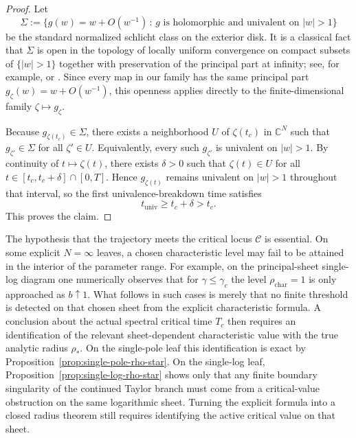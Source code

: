 \documentclass[11pt]{amsart}
\numberwithin{equation}{section}
\theoremstyle{plain}
\theoremstyle{definition}
\theoremstyle{remark}
\newcommand{\CC}{\mathbb{C}}
\newcommand{\univ}{\mathrm{univ}}
\begin{document}
\begin{proof}
	Let
	\[
		\Sigma:=\bigl\{g(w)=w+O(w^{-1})\, :\, g \text{ is holomorphic and univalent on } |w|>1\bigr\}
	\]
	be the standard normalized schlicht class on the exterior disk. It is a classical fact that $\Sigma$ is open in the topology
	of locally uniform convergence on compact subsets of $\{|w|>1\}$ together with preservation of the principal part at infinity;
	see, for example, \cite[Ch.~I]{Pommerenke1992} or \cite[Ch.~2]{Duren1983}. Since every map in our family has the same principal part
	$g_\zeta(w)=w+O(w^{-1})$, this openness applies directly to the finite-dimensional family
	$\zeta\mapsto g_\zeta$.

	Because $g_{\zeta(t_c)}\in\Sigma$, there exists a neighborhood $U$ of $\zeta(t_c)$ in $\CC^N$ such that
	$g_{\zeta'}\in\Sigma$ for all $\zeta'\in U$. Equivalently, every such $g_{\zeta'}$ is univalent on $|w|>1$.
	By continuity of $t\mapsto \zeta(t)$, there exists $\delta>0$ such that
	$\zeta(t)\in U$ for all $t\in[t_c,t_c+\delta]\cap[0,T]$. Hence $g_{\zeta(t)}$ remains univalent on $|w|>1$
	throughout that interval, so the first univalence-breakdown time satisfies
	\[
		t_{\univ}\ge t_c+\delta>t_c.
	\]
	This proves the claim.
\end{proof}

	The hypothesis that the trajectory meets the critical locus \(\mathcal C\) is essential.
	On some explicit \(N=\infty\) leaves, a chosen characteristic level may fail to be
	attained in the interior of the parameter range. For example, on the
	principal-sheet single-log diagram one numerically observes that for
	\(\gamma\le\gamma_c\) the level \(\rho_{\mathrm{char}}=1\) is only approached as
	\(b\uparrow1\). What follows in such cases is merely that no finite threshold is
	detected on that chosen sheet from the explicit characteristic formula.
	A conclusion about the actual spectral critical time \(T_c\) then requires an
	identification of the relevant sheet-dependent characteristic value with the true
	analytic radius \(\rho_*\). On the single-pole leaf this identification is exact by
	Proposition~\ref{prop:single-pole-rho-star}. On the single-log leaf,
	Proposition~\ref{prop:single-log-rho-star} shows only that any finite boundary
	singularity of the continued Taylor branch must come from a critical-value
	obstruction on the same logarithmic sheet. Turning the explicit formula into a closed
	radius theorem still requires identifying the active critical value on that sheet.

\end{document}
